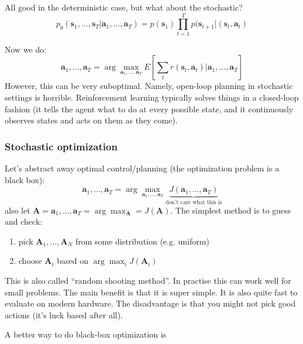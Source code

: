 \documentclass{report}
\newcommand{\argmax}{\arg\!\max}
\begin{document}
All good in the deterministic case, but what about the stochastic?
\begin{equation}
p_\theta \left( \bm{s}_1, \dots, \bm{s}_T |  \bm{a}_1, \dots, \bm{a}_T \right) 
= p(\bm{s}_1) \prod_{t=1}^{T} p(\bm{s}_{t+1}| (\bm{s}_{t}, \bm{a}_{t} ) 
\end{equation}

Now we do:
\begin{equation}
		\bm{a}_1, \dots, \bm{a}_T = \argmax_{\bm{a}_1, \dots, \bm{a}_T} E \left[ 
		\sum_{t}^{} r (\bm{s}_{t}, \bm{a}_{t} ) | \bm{a}_1, \dots, \bm{a}_T \right] 
\end{equation}
However, this can be very suboptimal. Namely, open-loop planning in stochastic settings is horrible.
Reinforcement learning typically solves things in a closed-loop fashion (it tells the agent what to do at every possible state,
and it continuously observes  states and acts on them as they come).

\subsubsection{Stochastic optimization}
Let's abstract away optimal control/planning (the optimization problem is a black box):
\begin{equation}
		\bm{a}_1, \dots, \bm{a}_T = \argmax_{\bm{a}_1, \dots, \bm{a}_T} \underbrace{J(\bm{a}_1, \dots, \bm{a}_T)}_{\text{don't care what this is}}
\end{equation}
also let $ \bm{A} = \bm{a}_1, \dots, \bm{a}_T =  \argmax_{\bm{A}} = J(\bm{A}) $.
The simplest method is to guess and check:
\begin{enumerate}
		\item pick $\bm{A}_1, \dots, \bm{A}_N $ from some distribution (e.g. uniform)
		\item choose $\bm{A}_i$ based on $\argmax_i J(\bm{A}_i)  $
\end{enumerate}
This is also called ``random shooting method''.
In practise this can work well for small problems.
The main benefit is that it is super simple. It is also quite fast to evaluate on modern hardware.
The disadvantage is that you might not pick good actions (it's luck based after all).

A better way to do black-box optimization is
\end{document}
